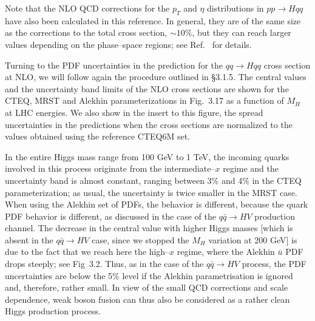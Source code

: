 \begin{figure}[h] 
\centerline{ 
} 
\vspace*{-.2cm}
\end{figure} 

Note that the NLO QCD corrections for the $p_T$ and $\eta$ distributions in $pp
\to Hqq$ have also been calculated in this reference. In general, they are 
of the same size as the corrections to the total cross section, $\sim 10\%$, 
but they can reach larger values depending on the phase--space regions; see 
Ref.~\cite{pp-Hqq-NLO2} for details. \s

Turning to the PDF uncertainties in the prediction for the $qq \to Hqq$
cross section at NLO, we will follow again the procedure outlined in \S3.1.5. 
The  central values and the uncertainty band limits of the NLO cross sections 
are shown for the CTEQ, MRST and Alekhin parameterizations in Fig.~3.17 as a 
function of $M_H$ at LHC energies. We also show in the insert to this 
figure, the spread uncertainties in the predictions when the cross sections 
are normalized to the values obtained using the reference CTEQ6M set.\s

In the entire Higgs mass range from 100 GeV  to 1 TeV, the incoming
quarks involved in this process originate from the intermediate--$x$ regime and
the uncertainty band is almost constant, ranging between 3\% and 4\% in the 
CTEQ parameterization; as usual, the uncertainty is twice smaller in the MRST 
case. When using the Alekhin set of PDFs, the behavior is different, because 
the quark PDF behavior is different, as discussed in the case of the $q\bar{q}
\to HV$  production channel. The decrease in the central value with higher 
Higgs masses [which is absent in the $q\bar{q} \to HV$ case, since we 
stopped the $M_H$ variation at 200 GeV] is due to the fact that we reach here 
the high--$x$ regime, where the Alekhin $\bar{u}$ PDF drops steeply; see 
Fig~3.2.  Thus, as in the case of the $q\bar q \to HV$ process, the PDF 
uncertainties are below the 5\% level if the Alekhin parametrisation is 
ignored and, therefore, rather small. In view of the small QCD corrections and
scale dependence, weak boson fusion can thus also be considered as a rather 
clean Higgs production process. \s


